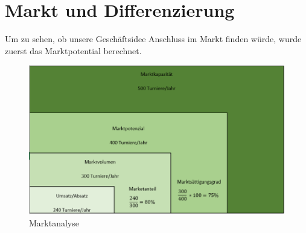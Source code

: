 \section{Markt und Differenzierung}
Um zu sehen, ob unsere Geschäftsidee Anschluss im Markt finden würde, wurde zuerst das Marktpotential berechnet. 

\begin{figure}[H]
	\centering
	\includegraphics[width=0.85\linewidth]{images/marktanalyse.PNG}
	\caption{Marktanalyse}
	\label{fig:marktanalyse}
\end{figure}

